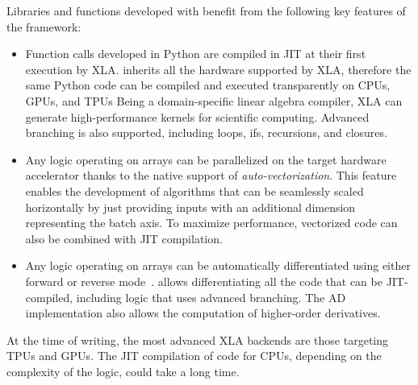 Libraries and functions developed with \jax benefit from the following key features of the framework:
%
\begin{itemize}
%
\item
Function calls developed in Python are compiled in \ac{JIT} at their first execution by \ac{XLA}.
\jax inherits all the hardware supported by \ac{XLA}, therefore the same Python code can be compiled and executed transparently on \acp{CPU}, \acp{GPU}, and \acp{TPU}
Being a domain-specific linear algebra compiler, \ac{XLA} can generate high-performance kernels for scientific computing.
Advanced branching is also supported, including loops, ifs, recursions, and closures.

\item
Any logic operating on \jax arrays can be parallelized on the target hardware accelerator thanks to the native support of \emph{auto-vectorization}.
This feature enables the development of algorithms that can be seamlessly scaled horizontally by just providing inputs with an additional dimension representing the batch axis.
To maximize performance, vectorized code can also be combined with \ac{JIT} compilation.

\item
Any logic operating on \jax arrays can be automatically differentiated using either forward or reverse mode~\parencite{blondel_efficient_2022}.
\jax allows differentiating all the code that can be \ac{JIT}-compiled, including logic that uses advanced branching.
The \ac{AD} implementation also allows the computation of higher-order derivatives.
%
\end{itemize}

\noindent
At the time of writing, the most advanced \ac{XLA} backends are those targeting \acp{TPU} and \acp{GPU}.
The \ac{JIT} compilation of code for \acp{CPU}, depending on the complexity of the logic, could take a long time.
